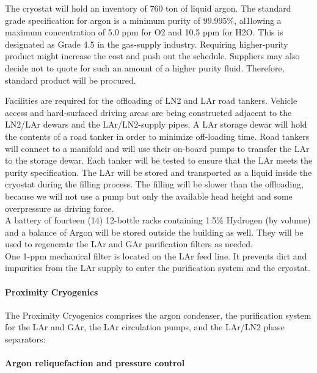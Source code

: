 The cryostat will hold an inventory of 760 ton of liquid argon. The standard grade specification for argon is a minimum purity of 99.995\%, al1lowing a maximum concentration of 5.0 ppm for O2 and 10.5 ppm for H2O. This is designated as Grade 4.5 in the gas-supply industry. Requiring higher-purity product might increase the cost and push out the schedule. Suppliers may also decide not to quote for such an amount of a higher purity fluid. Therefore, standard product will be procured.

Facilities are required for the offloading of LN2 and LAr road tankers. Vehicle access and hard-surfaced driving areas are being constructed adjacent to the LN2/LAr dewars and the LAr/LN2-supply pipes. A LAr storage dewar will hold the contents of a road tanker in order to minimize off-loading time. Road tankers will connect to a manifold and will use their on-board pumps to transfer the LAr to the storage dewar. Each tanker will be tested to ensure that the LAr meets the purity specification. The LAr will be stored and transported as a liquid inside the cryostat during the filling process. The filling will be slower than the offloading, because we will not use a pump but only the available head height and some overpressure as driving force. \\
%
A battery of fourteen (14) 12-bottle racks containing 1.5\% Hydrogen (by volume) and a balance of Argon will be stored outside the building as well. They will be used to regenerate the LAr and GAr purification filters as needed.\\
%
One 1-ppm mechanical filter is located on the LAr feed line. It prevents dirt and impurities from the LAr supply to enter the purification system and the cryostat.

\paragraph{Proximity Cryogenics}

The Proximity Cryogenics comprises the argon condenser, the purification system for the LAr and GAr, the LAr circulation pumps, and the LAr/LN2 phase separators:

\paragraph{Argon reliquefaction and pressure control}

